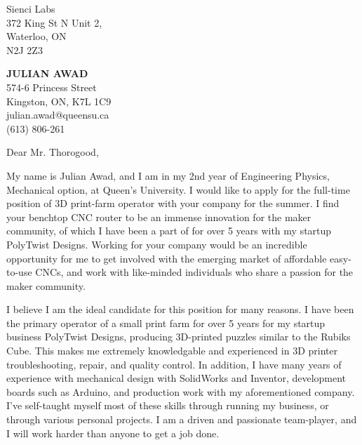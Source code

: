 \documentclass[11pt]{letter} %
\begin{document}
\begin{letter}{Sienci Labs \\
 372 King St N Unit 2,\\
 Waterloo, ON \\
 N2J 2Z3}

\begin{center}
\textbf{\huge JULIAN AWAD} \\ %
\vspace{1em} %
574-6 Princess Street \\ Kingston, ON, K7L 1C9 \\ julian.awad@queensu.ca \\ (613) 806-261 %
\end{center}
\hspace{2em}
\signature{Julian Awad} %
\vspace{-0.3in}
\opening{Dear Mr. Thorogood,}

My name is Julian Awad, and I am in my 2nd year of Engineering Physics, Mechanical option, at Queen's University. I would like to apply for the full-time position of 3D print-farm operator with your company for the summer. I find your benchtop CNC router to be an immense innovation for the maker community, of which I have been a part of for over 5 years with my startup PolyTwist Designs. Working for your company would be an incredible opportunity for me to get involved with the emerging market of affordable easy-to-use CNCs, and work with like-minded individuals who share a passion for the maker community.

I believe I am the ideal candidate for this position for many reasons. I have been the primary operator of a small print farm for over 5 years for my startup business PolyTwist Designs, producing 3D-printed puzzles similar to the Rubiks Cube. This makes me extremely knowledgable and experienced in 3D printer troubleshooting, repair, and quality control. In addition, I have many years of experience with mechanical design with SolidWorks and Inventor, development boards such as Arduino, and production work with my aforementioned company. I've self-taught myself most of these skills through running my business, or through various personal projects. I am a driven and passionate team-player, and I will work harder than anyone to get a job done.


\end{letter}
\end{document}
